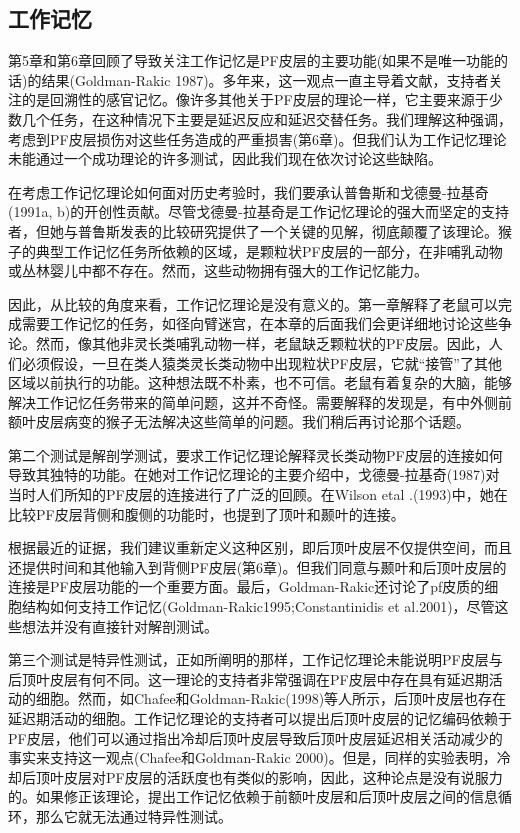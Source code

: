 \subsection{工作记忆}
第5章和第6章回顾了导致关注工作记忆是PF皮层的主要功能(如果不是唯一功能的话)的结果(Goldman-Rakic 1987)。多年来，这一观点一直主导着文献，支持者关注的是回溯性的感官记忆。像许多其他关于PF皮层的理论一样，它主要来源于少数几个任务，在这种情况下主要是延迟反应和延迟交替任务。我们理解这种强调，考虑到PF皮层损伤对这些任务造成的严重损害(第6章)。但我们认为工作记忆理论未能通过一个成功理论的许多测试，因此我们现在依次讨论这些缺陷。
\par 
在考虑工作记忆理论如何面对历史考验时，我们要承认普鲁斯和戈德曼-拉基奇(1991a, b)的开创性贡献。尽管戈德曼-拉基奇是工作记忆理论的强大而坚定的支持者，但她与普鲁斯发表的比较研究提供了一个关键的见解，彻底颠覆了该理论。猴子的典型工作记忆任务所依赖的区域，是颗粒状PF皮层的一部分，在非哺乳动物或丛林婴儿中都不存在。然而，这些动物拥有强大的工作记忆能力。
\par 
因此，从比较的角度来看，工作记忆理论是没有意义的。第一章解释了老鼠可以完成需要工作记忆的任务，如径向臂迷宫，在本章的后面我们会更详细地讨论这些争论。然而，像其他非灵长类哺乳动物一样，老鼠缺乏颗粒状的PF皮层。因此，人们必须假设，一旦在类人猿类灵长类动物中出现粒状PF皮层，它就“接管”了其他区域以前执行的功能。这种想法既不朴素，也不可信。老鼠有着复杂的大脑，能够解决工作记忆任务带来的简单问题，这并不奇怪。需要解释的发现是，有中外侧前额叶皮层病变的猴子无法解决这些简单的问题。我们稍后再讨论那个话题。
\par 
第二个测试是解剖学测试，要求工作记忆理论解释灵长类动物PF皮层的连接如何导致其独特的功能。在她对工作记忆理论的主要介绍中，戈德曼-拉基奇(1987)对当时人们所知的PF皮层的连接进行了广泛的回顾。在Wilson etal .(1993)中，她在比较PF皮层背侧和腹侧的功能时，也提到了顶叶和颞叶的连接。
\par 
根据最近的证据，我们建议重新定义这种区别，即后顶叶皮层不仅提供空间，而且还提供时间和其他输入到背侧PF皮层(第6章)。但我们同意与颞叶和后顶叶皮层的连接是PF皮层功能的一个重要方面。最后，Goldman-Rakic还讨论了pf皮质的细胞结构如何支持工作记忆(Goldman-Rakic1995;Constantinidis et al.2001)，尽管这些想法并没有直接针对解剖测试。
\par 
第三个测试是特异性测试，正如所阐明的那样，工作记忆理论未能说明PF皮层与后顶叶皮层有何不同。这一理论的支持者非常强调在PF皮层中存在具有延迟期活动的细胞。然而，如Chafee和Goldman-Rakic(1998)等人所示，后顶叶皮层也存在延迟期活动的细胞。工作记忆理论的支持者可以提出后顶叶皮层的记忆编码依赖于PF皮层，他们可以通过指出冷却后顶叶皮层导致后顶叶皮层延迟相关活动减少的事实来支持这一观点(Chafee和Goldman-Rakic 2000)。但是，同样的实验表明，冷却后顶叶皮层对PF皮层的活跃度也有类似的影响，因此，这种论点是没有说服力的。如果修正该理论，提出工作记忆依赖于前额叶皮层和后顶叶皮层之间的信息循环，那么它就无法通过特异性测试。
